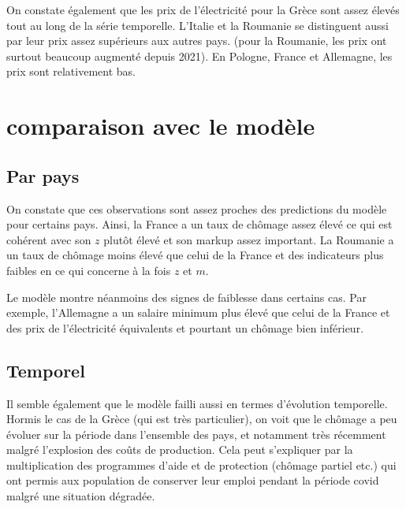 \documentclass{article}
\begin{document}
On constate également que les prix de l'électricité pour la Grèce sont assez élevés tout au long de la série temporelle. L'Italie et la Roumanie se distinguent aussi par leur prix assez supérieurs aux autres pays. (pour la Roumanie, les prix ont surtout beaucoup augmenté depuis 2021). En Pologne, France et Allemagne, les prix sont relativement bas.
\section{comparaison avec le modèle}

\subsection{Par pays}
On constate que ces observations sont assez proches des predictions du modèle pour certains pays. Ainsi, la France a un taux de chômage assez élevé ce qui est cohérent avec son $z$ plutôt élevé et son markup assez important. La Roumanie a un taux de chômage moins élevé que celui de la France et des indicateurs plus faibles en ce qui concerne à la fois $z$ et $m$.

Le modèle montre néanmoins des signes de faiblesse dans certains cas. Par exemple, l'Allemagne a un salaire minimum plus élevé que celui de la France et des prix de l'électricité équivalents et pourtant un chômage bien inférieur.

\subsection{Temporel}

Il semble également que le modèle failli aussi en termes d'évolution temporelle. Hormis le cas de la Grèce (qui est très particulier), on voit que le chômage a peu évoluer sur la période dans l'ensemble des pays, et notamment très récemment malgré l'explosion des coûts de production. Cela peut s'expliquer par la multiplication des programmes d'aide et de protection (chômage partiel etc.) qui ont permis aux population de conserver leur emploi pendant la période covid malgré une situation dégradée. 
\end{document}
